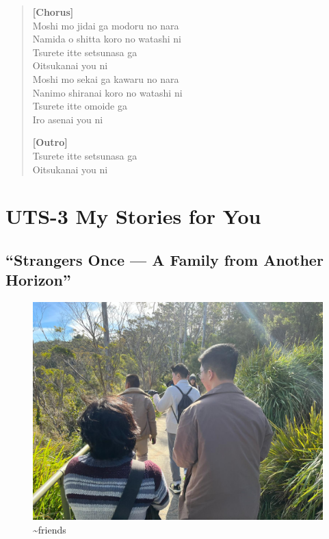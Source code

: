 \documentclass[
  letterpaper,
  DIV=11,
  numbers=noendperiod]{scrreprt}
\begin{document}
\begin{quote}
\textbf{{[}Chorus{]}}\\
Moshi mo jidai ga modoru no nara\\
Namida o shitta koro no watashi ni\\
Tsurete itte setsunasa ga\\
Oitsukanai you ni\\
Moshi mo sekai ga kawaru no nara\\
Nanimo shiranai koro no watashi ni\\
Tsurete itte omoide ga\\
Iro asenai you ni ~

\textbf{{[}Outro{]}}\\
Tsurete itte setsunasa ga\\
Oitsukanai you ni
\end{quote}


\chapter{UTS-3 My Stories for You}\label{uts-3-my-stories-for-you}

\section{``Strangers Once --- A Family from Another
Horizon''}\label{strangers-once-a-family-from-another-horizon}

\begin{figure}[H]

{\centering \includegraphics[width=9.5\linewidth,height=\textheight,keepaspectratio]{My_Stories_for_You/../images/story.jpg}

}

\caption{\textasciitilde friends}

\end{figure}%
\end{document}
